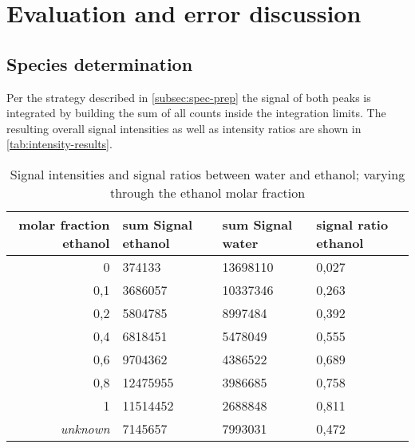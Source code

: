 
%     

\section{Evaluation and error discussion}
\label{sec:eval}

\subsection{Species determination}
\label{subsec:spec-eval}

Per the strategy described in \autoref{subsec:spec-prep} the signal of both peaks is integrated by building the sum of all counts inside the integration limits. The resulting overall signal intensities as well as intensity ratios are shown in \autoref{tab:intensity-results}.

\begin{table}[!htb]
    \centering
    \small
    \caption[Signal intensities and signal ratios between water and ethanol]{Signal intensities and signal ratios between water and ethanol; varying through the ethanol molar fraction}
    \label{tab:intensity-results}
    \vspace{12pt}
    \begin{tabular}{|r|l|l|l|}
        \hline
        \rowcolor{lightgray} molar fraction ethanol & sum Signal ethanol & sum Signal water & signal ratio ethanol \\ \hline \hline
        0	    & 374133	& 13698110  & 0,027 \\ \hline
        0,1	    & 3686057	& 10337346  & 0,263 \\ \hline
        0,2	    & 5804785	& 8997484	& 0,392 \\ \hline
        0,4	    & 6818451	& 5478049	& 0,555 \\ \hline
        0,6	    & 9704362	& 4386522	& 0,689 \\ \hline
        0,8	    & 12475955	& 3986685	& 0,758 \\ \hline
        1	    & 11514452	& 2688848	& 0,811 \\ \hline
        \itshape{unknown}	& 7145657	& 7993031	& 0,472 \\ \hline
    \end{tabular}
\end{table}

